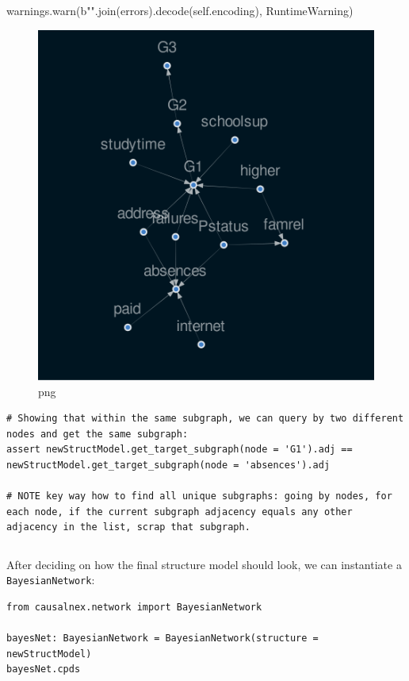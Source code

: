 \documentclass[
]{article}
\begin{document}
warnings.warn(b"".join(errors).decode(self.encoding), RuntimeWarning)

\begin{figure}
\centering
\includegraphics{FirstCausalNexTutorial_files/FirstCausalNexTutorial_100_1.png}
\caption{png}
\end{figure}

\begin{verbatim}
# Showing that within the same subgraph, we can query by two different nodes and get the same subgraph:
assert newStructModel.get_target_subgraph(node = 'G1').adj == newStructModel.get_target_subgraph(node = 'absences').adj

# NOTE key way how to find all unique subgraphs: going by nodes, for each node, if the current subgraph adjacency equals any other adjacency in the list, scrap that subgraph.
\end{verbatim}

\begin{verbatim}

\end{verbatim}

After deciding on how the final structure model should look, we can
instantiate a \texttt{BayesianNetwork}:

\begin{verbatim}
from causalnex.network import BayesianNetwork

bayesNet: BayesianNetwork = BayesianNetwork(structure = newStructModel)
bayesNet.cpds
\end{verbatim}
\end{document}
